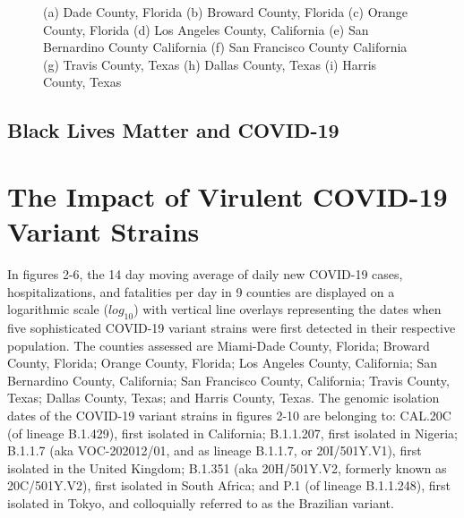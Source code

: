 \documentclass[]{article}
\begin{document}
\begin{figure}
	\caption{(a) Dade County, Florida (b) Broward County, Florida (c) Orange County, Florida (d) Los Angeles County, California (e) San Bernardino County California (f) San Francisco County California (g) Travis County, Texas (h) Dallas County, Texas (i) Harris County, Texas}
	\label{fig:foobar}
\end{figure}
\FloatBarrier
\vspace{5mm}


\subsection{Black Lives Matter and COVID-19}

\vspace{5mm}
\section{The Impact of Virulent COVID-19 Variant Strains}

\indent In figures 2-6, the 14 day moving average of daily new COVID-19 cases, hospitalizations, and fatalities per day in 9 counties are displayed on a logarithmic scale ($log_{10}$) with vertical line overlays representing the dates when five sophisticated COVID-19 variant strains were first detected in their respective population. The counties assessed are Miami-Dade County, Florida; Broward County, Florida; Orange County, Florida; Los Angeles County, California; San Bernardino County, California; San Francisco County, California; Travis County, Texas; Dallas County, Texas; and Harris County, Texas. The genomic isolation dates of the COVID-19 variant strains in figures 2-10 are belonging to: CAL.20C (of lineage B.1.429), first isolated in California; B.1.1.207, first isolated in Nigeria; B.1.1.7 (aka VOC-202012/01, and as lineage B.1.1.7, or 20I/501Y.V1), first isolated in the United Kingdom; B.1.351 (aka 20H/501Y.V2, formerly known as 20C/501Y.V2), first isolated in South Africa; and P.1 (of lineage B.1.1.248), first isolated in Tokyo, and colloquially referred to as the Brazilian variant. 
\end{document}
